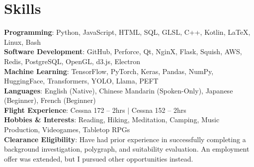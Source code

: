 \section{Skills}
 \begin{itemize}[leftmargin=0.5cm, label={}]
    \small{\item{
     \textbf{Programming}{: Python, JavaScript, HTML, SQL, GLSL, C++, Kotlin, \LaTeX, Linux, Bash} \\\vspace{1pt}
     \textbf{Software Development}{: GitHub, Perforce, Qt, NginX, Flask, Squish, AWS, Redis, PostgreSQL, OpenGL, d3.js, Electron} \\\vspace{1pt}
     \textbf{Machine Learning}{: TensorFlow, PyTorch, Keras, Pandas, NumPy, HuggingFace, Transformers, YOLO, Llama, PEFT} \\\vspace{1pt}
     \textbf{Languages}{: English (Native), Chinese Mandarin (Spoken-Only), Japanese (Beginner), French (Beginner)} \\\vspace{1pt}
     \textbf{Flight Experience}{: Cessna 172 -- 2hrs $|$ Cessna 152 -- 2hrs} \\\vspace{1pt}
     \textbf{Hobbies \& Interests}{: Reading, Hiking, Meditation, Camping, Music Production, Videogames, Tabletop RPGs} \\\vspace{1pt}
     \textbf{Clearance Eligibility}{: Have had prior experience in successfully completing a background investigation, polygraph, and suitability evaluation. An employment offer was extended, but I pursued other opportunities instead.} \\\vspace{1pt}
    }}
 \end{itemize}